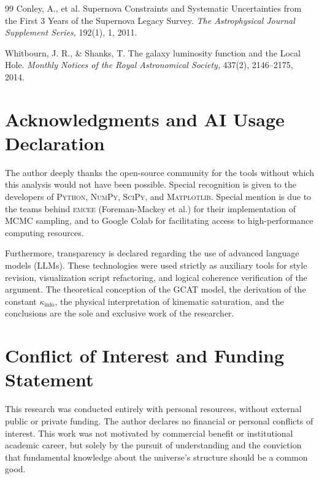 \documentclass[12pt, a4paper]{article}
\theoremstyle{plain}
\theoremstyle{definition}
\begin{document}
\begin{thebibliography}{99}
Conley, A., et al.
\newblock Supernova Constraints and Systematic Uncertainties from the First 3 Years of the Supernova Legacy Survey.
\newblock \textit{The Astrophysical Journal Supplement Series}, 192(1), 1, 2011.

Whitbourn, J. R., \& Shanks, T.
\newblock The galaxy luminosity function and the Local Hole.
\newblock \textit{Monthly Notices of the Royal Astronomical Society}, 437(2), 2146–2175, 2014.

\end{thebibliography}

\section*{Acknowledgments and AI Usage Declaration}

The author deeply thanks the open-source community for the tools without which this analysis would not have been possible. Special recognition is given to the developers of \textsc{Python}, \textsc{NumPy}, \textsc{SciPy}, and \textsc{Matplotlib}. Special mention is due to the teams behind \textsc{emcee} (Foreman-Mackey et al.) for their implementation of MCMC sampling, and to Google Colab for facilitating access to high-performance computing resources.

Furthermore, transparency is declared regarding the use of advanced language models (LLMs). These technologies were used strictly as auxiliary tools for style revision, visualization script refactoring, and logical coherence verification of the argument. The theoretical conception of the GCAT model, the derivation of the constant $\kappa_{\text{info}}$, the physical interpretation of kinematic saturation, and the conclusions are the sole and exclusive work of the researcher.

\section*{Conflict of Interest and Funding Statement}

This research was conducted entirely with personal resources, without external public or private funding. The author declares no financial or personal conflicts of interest. This work was not motivated by commercial benefit or institutional academic career, but solely by the pursuit of understanding and the conviction that fundamental knowledge about the universe's structure should be a common good.
\end{document}
